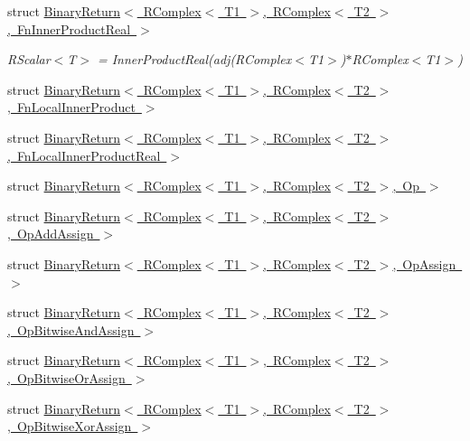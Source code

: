 \begin{DoxyCompactItemize}
struct \mbox{\hyperlink{structENSEM_1_1BinaryReturn_3_01RComplex_3_01T1_01_4_00_01RComplex_3_01T2_01_4_00_01FnInnerProductReal_01_4}{Binary\+Return$<$ R\+Complex$<$ T1 $>$, R\+Complex$<$ T2 $>$, Fn\+Inner\+Product\+Real $>$}}
\begin{DoxyCompactList}\small\item\em R\+Scalar$<$\+T$>$ = Inner\+Product\+Real(adj(\+R\+Complex$<$\+T1$>$)$\ast$\+R\+Complex$<$\+T1$>$) \end{DoxyCompactList}\item 
struct \mbox{\hyperlink{structENSEM_1_1BinaryReturn_3_01RComplex_3_01T1_01_4_00_01RComplex_3_01T2_01_4_00_01FnLocalInnerProduct_01_4}{Binary\+Return$<$ R\+Complex$<$ T1 $>$, R\+Complex$<$ T2 $>$, Fn\+Local\+Inner\+Product $>$}}
\item 
struct \mbox{\hyperlink{structENSEM_1_1BinaryReturn_3_01RComplex_3_01T1_01_4_00_01RComplex_3_01T2_01_4_00_01FnLocalInnerProductReal_01_4}{Binary\+Return$<$ R\+Complex$<$ T1 $>$, R\+Complex$<$ T2 $>$, Fn\+Local\+Inner\+Product\+Real $>$}}
\item 
struct \mbox{\hyperlink{structENSEM_1_1BinaryReturn_3_01RComplex_3_01T1_01_4_00_01RComplex_3_01T2_01_4_00_01Op_01_4}{Binary\+Return$<$ R\+Complex$<$ T1 $>$, R\+Complex$<$ T2 $>$, Op $>$}}
\item 
struct \mbox{\hyperlink{structENSEM_1_1BinaryReturn_3_01RComplex_3_01T1_01_4_00_01RComplex_3_01T2_01_4_00_01OpAddAssign_01_4}{Binary\+Return$<$ R\+Complex$<$ T1 $>$, R\+Complex$<$ T2 $>$, Op\+Add\+Assign $>$}}
\item 
struct \mbox{\hyperlink{structENSEM_1_1BinaryReturn_3_01RComplex_3_01T1_01_4_00_01RComplex_3_01T2_01_4_00_01OpAssign_01_4}{Binary\+Return$<$ R\+Complex$<$ T1 $>$, R\+Complex$<$ T2 $>$, Op\+Assign $>$}}
\item 
struct \mbox{\hyperlink{structENSEM_1_1BinaryReturn_3_01RComplex_3_01T1_01_4_00_01RComplex_3_01T2_01_4_00_01OpBitwiseAndAssign_01_4}{Binary\+Return$<$ R\+Complex$<$ T1 $>$, R\+Complex$<$ T2 $>$, Op\+Bitwise\+And\+Assign $>$}}
\item 
struct \mbox{\hyperlink{structENSEM_1_1BinaryReturn_3_01RComplex_3_01T1_01_4_00_01RComplex_3_01T2_01_4_00_01OpBitwiseOrAssign_01_4}{Binary\+Return$<$ R\+Complex$<$ T1 $>$, R\+Complex$<$ T2 $>$, Op\+Bitwise\+Or\+Assign $>$}}
\item 
struct \mbox{\hyperlink{structENSEM_1_1BinaryReturn_3_01RComplex_3_01T1_01_4_00_01RComplex_3_01T2_01_4_00_01OpBitwiseXorAssign_01_4}{Binary\+Return$<$ R\+Complex$<$ T1 $>$, R\+Complex$<$ T2 $>$, Op\+Bitwise\+Xor\+Assign $>$}}

\end{DoxyCompactItemize}
